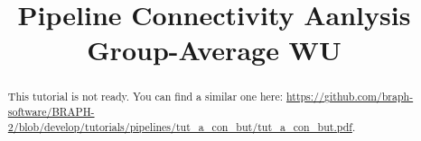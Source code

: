 \documentclass[justified]{tufte-handout}
\title{Pipeline Connectivity Aanlysis Group-Average WU}
\begin{document}
\maketitle

\begin{abstract}
\noindent
This tutorial is not ready. You can find a similar one here: \url{https://github.com/braph-software/BRAPH-2/blob/develop/tutorials/pipelines/tut_a_con_but/tut_a_con_but.pdf}.
\end{abstract}
\end{document}
